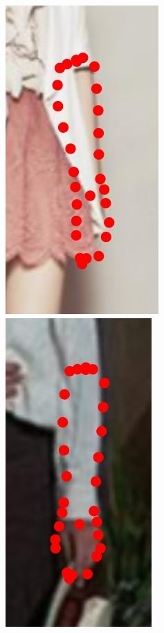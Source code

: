 \begin{figure}
    \includegraphics[height=\ofh]{resources/Annotation_Correction/Suplementory_Meterial/ExFit/0041}
    \hfill
    \includegraphics[height=\ofh]{resources/Annotation_Correction/Suplementory_Meterial/ExFit/0042}
    \hfill

\end{figure}
